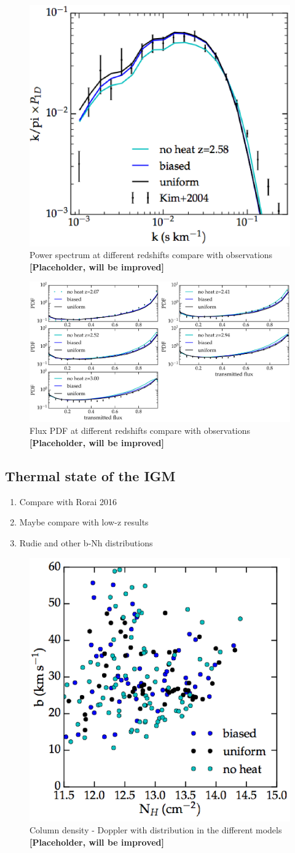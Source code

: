 \documentclass[numberedappendix]{emulateapj}
\newcommand\ALc[1]{{\color{red} \bf #1}} %
\begin{document}
\begin{figure}[h]
\centering
\includegraphics[width = .45\textwidth ]{powerspec}
\caption{ Power spectrum at different redshifts compare with observations \ALc{[Placeholder, will be improved]}}
\label{fig:powespec}
\end{figure}

\begin{figure}[h]
\centering
\includegraphics[width = .9\textwidth ]{flux_PDF}
\caption{Flux PDF at different redshifts compare with observations \ALc{[Placeholder, will be improved]}}
\label{fig:fluxPDF}
\end{figure}

\subsection{Thermal state of the IGM}
\begin{enumerate}
\item Compare with Rorai 2016
\item Maybe compare with low-z results
\item Rudie and other b-Nh distributions
\end{enumerate}
\begin{figure}
\centering
\includegraphics[width = .45\textwidth ]{b_Nh}
\caption{ Column density - Doppler with distribution in the different models \ALc{[Placeholder, will be improved]}}
\label{fig:b_Nh}
\end{figure}
\end{document}
